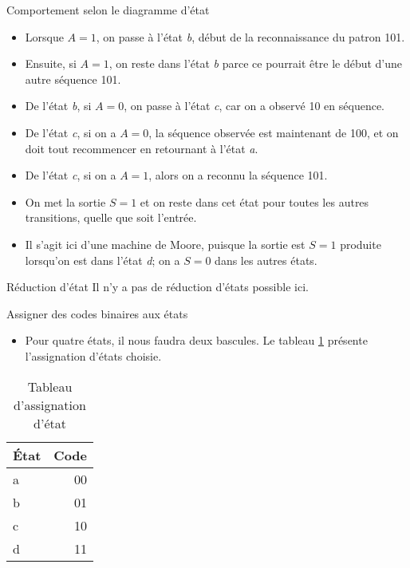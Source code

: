 \documentclass[presentation]{beamer}
\begin{document}
\begin{frame}[label={sec:org4e1e271}]{Comportement selon le diagramme d'état}
\begin{itemize}
\item Lorsque \(A=1\), on passe à l'état \emph{b}, début de la reconnaissance du patron 101.

\item Ensuite, si \(A=1\), on reste dans l'état \emph{b} parce ce pourrait être le début d'une autre séquence 101.

\item De l'état \emph{b}, si \(A=0\), on passe à l'état \emph{c}, car on a observé 10 en séquence.

\item De l'état \emph{c}, si on a \(A=0\), la séquence observée est maintenant de 100, et on doit tout recommencer en retournant à l'état \emph{a}.

\item De l'état \emph{c}, si on a \(A=1\), alors on a reconnu la séquence 101.

\item On met la sortie \(S=1\) et on reste dans cet état pour toutes les autres transitions, quelle que soit l'entrée.

\item Il s'agit ici d'une machine de Moore, puisque la sortie est \(S=1\) produite lorsqu'on est dans l'état \emph{d}; on a \(S=0\) dans les autres états.
\end{itemize}
\end{frame}


\begin{frame}[label={sec:org425b9eb}]{Réduction d'état}
Il n'y a pas de réduction d'états possible ici.
\end{frame}

\begin{frame}[label={sec:org09dac3b}]{Assigner des codes binaires aux états}
\begin{itemize}
\item Pour quatre états, il nous faudra deux bascules.  Le tableau \ref{tab:org8a6639f} présente l'assignation d'états choisie.
\end{itemize}

\begin{table}[htbp]
\caption{\label{tab:org8a6639f}Tableau d'assignation d'état}
\centering
\begin{tabular}{lr}
État & Code\\
\hline
a & 00\\
b & 01\\
c & 10\\
d & 11\\
\end{tabular}
\end{table}
\end{frame}
\end{document}
